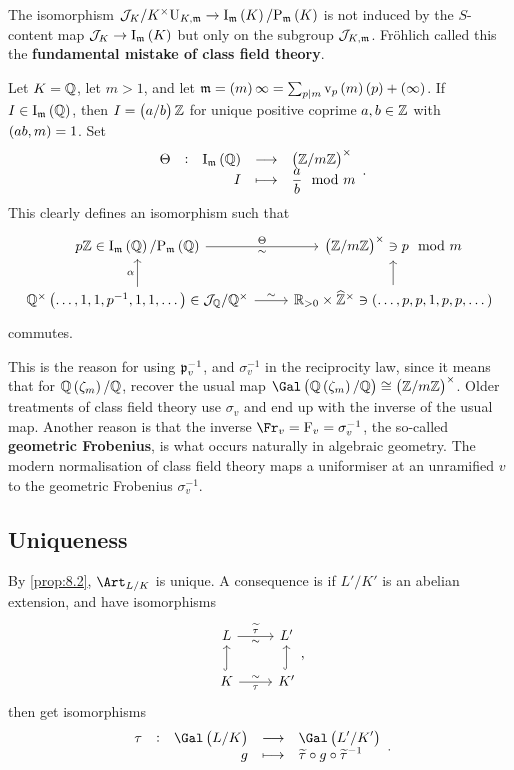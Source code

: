 \begin{remark*}
The isomorphism $ \JJJ_K / K^\times\U_{K, \mmm} \to \I_\mmm\br{K} / \P_\mmm\br{K} $ is not induced by the $ S $-content map $ \JJJ_K \to \I_\mmm\br{K} $ but only on the subgroup $ \mathcal{J}_{K, \mathfrak{m}} $. Fr\"ohlich called this the \textbf{fundamental mistake of class field theory}.
\end{remark*}

\begin{example*}
Let $ K = \mathbb{Q} $, let $ m > 1 $, and let $ \mmm = \br{m}\infty = \sum_{p \mid m} \v_p\br{m}\br{p} + \br{\infty} $. If $ I \in \I_\mmm\br{\QQ} $, then $ I = \br{a / b}\ZZ $ for unique positive coprime $ a, b \in \mathbb{Z} $ with $ \br{ab, m} = 1 $. Set
$$ \function[\Theta]{\I_\mmm\br{\QQ}}{\br{\ZZ / m\ZZ}^\times}{I}{\dfrac{a}{b} \mod m}. $$
This clearly defines an isomorphism such that
$$
\begin{tikzcd}
p\ZZ \in \I_\mmm\br{\QQ} / \P_\mmm\br{\QQ} \arrow{r}{\Theta}[swap]{\sim} & \br{\ZZ / m\ZZ}^\times \ni p \mod m \\
\QQ^\times\br{\dots, 1, 1, p^{-1}, 1, 1, \dots} \in \JJJ_\QQ / \QQ^\times \arrow{u}{\alpha} \arrow{r}{\sim} & \RR_{> 0} \times \widehat{\ZZ}^\times \arrow{u} \ni \br{\dots, p, p, 1, p, p, \dots}
\end{tikzcd}
$$
commutes.
\end{example*}

This is the reason for using $ \mathfrak{p}_v^{-1} $, and $ \sigma_v^{-1} $ in the reciprocity law, since it means that for $ \QQ\br{\zeta_m} / \QQ $, recover the usual map $ \Gal\br{\QQ\br{\zeta_m} / \QQ} \cong \br{\ZZ / m\ZZ}^\times $. Older treatments of class field theory use $ \sigma_v $ and end up with the inverse of the usual map. Another reason is that the inverse $ \Fr_v = \F_v = \sigma_v^{-1} $, the so-called \textbf{geometric Frobenius}, is what occurs naturally in algebraic geometry. The modern normalisation of class field theory maps a uniformiser at an unramified $ v $ to the geometric Frobenius $ \sigma_v^{-1} $.

\subsection{Uniqueness}


By \ref{prop:8.2}, $ \Art_{L / K} $ is unique. A consequence is if $ L' / K' $ is an abelian extension, and have isomorphisms
$$
\begin{tikzcd}
L \arrow{r}{\widetilde{\tau}}[swap]{\sim} & L' \\
K \arrow[hookrightarrow]{u} \arrow{r}{\sim}[swap]{\tau} & K' \arrow[hookrightarrow]{u}
\end{tikzcd},
$$
then get isomorphisms
$$ \function[\tau]{\Gal\br{L / K}}{\Gal\br{L' / K'}}{g}{\widetilde{\tau} \circ g \circ \widetilde{\tau}^{-1}}. $$

